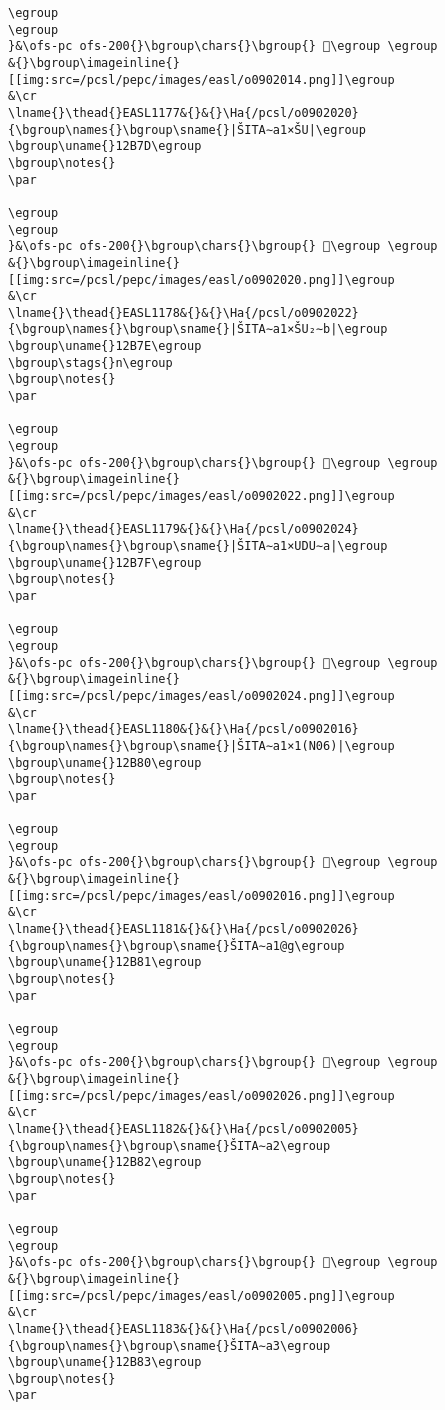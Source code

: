 \begin{verbatim}
\egroup
\egroup
}&\ofs-pc ofs-200{}\bgroup\chars{}\bgroup{} 𒭼\egroup \egroup
&{}\bgroup\imageinline{}[[img:src=/pcsl/pepc/images/easl/o0902014.png]]\egroup
&\cr
\lname{}\thead{}EASL1177&{}&{}\Ha{/pcsl/o0902020}{\bgroup\names{}\bgroup\sname{}|ŠITA∼a1×ŠU|\egroup
\bgroup\uname{}12B7D\egroup
\bgroup\notes{}
\par 

\egroup
\egroup
}&\ofs-pc ofs-200{}\bgroup\chars{}\bgroup{} 𒭽\egroup \egroup
&{}\bgroup\imageinline{}[[img:src=/pcsl/pepc/images/easl/o0902020.png]]\egroup
&\cr
\lname{}\thead{}EASL1178&{}&{}\Ha{/pcsl/o0902022}{\bgroup\names{}\bgroup\sname{}|ŠITA∼a1×ŠU₂∼b|\egroup
\bgroup\uname{}12B7E\egroup
\bgroup\stags{}n\egroup
\bgroup\notes{}
\par 

\egroup
\egroup
}&\ofs-pc ofs-200{}\bgroup\chars{}\bgroup{} 𒭾\egroup \egroup
&{}\bgroup\imageinline{}[[img:src=/pcsl/pepc/images/easl/o0902022.png]]\egroup
&\cr
\lname{}\thead{}EASL1179&{}&{}\Ha{/pcsl/o0902024}{\bgroup\names{}\bgroup\sname{}|ŠITA∼a1×UDU∼a|\egroup
\bgroup\uname{}12B7F\egroup
\bgroup\notes{}
\par 

\egroup
\egroup
}&\ofs-pc ofs-200{}\bgroup\chars{}\bgroup{} 𒭿\egroup \egroup
&{}\bgroup\imageinline{}[[img:src=/pcsl/pepc/images/easl/o0902024.png]]\egroup
&\cr
\lname{}\thead{}EASL1180&{}&{}\Ha{/pcsl/o0902016}{\bgroup\names{}\bgroup\sname{}|ŠITA∼a1×1(N06)|\egroup
\bgroup\uname{}12B80\egroup
\bgroup\notes{}
\par 

\egroup
\egroup
}&\ofs-pc ofs-200{}\bgroup\chars{}\bgroup{} 𒮀\egroup \egroup
&{}\bgroup\imageinline{}[[img:src=/pcsl/pepc/images/easl/o0902016.png]]\egroup
&\cr
\lname{}\thead{}EASL1181&{}&{}\Ha{/pcsl/o0902026}{\bgroup\names{}\bgroup\sname{}ŠITA∼a1@g\egroup
\bgroup\uname{}12B81\egroup
\bgroup\notes{}
\par 

\egroup
\egroup
}&\ofs-pc ofs-200{}\bgroup\chars{}\bgroup{} 𒮁\egroup \egroup
&{}\bgroup\imageinline{}[[img:src=/pcsl/pepc/images/easl/o0902026.png]]\egroup
&\cr
\lname{}\thead{}EASL1182&{}&{}\Ha{/pcsl/o0902005}{\bgroup\names{}\bgroup\sname{}ŠITA∼a2\egroup
\bgroup\uname{}12B82\egroup
\bgroup\notes{}
\par 

\egroup
\egroup
}&\ofs-pc ofs-200{}\bgroup\chars{}\bgroup{} 𒮂\egroup \egroup
&{}\bgroup\imageinline{}[[img:src=/pcsl/pepc/images/easl/o0902005.png]]\egroup
&\cr
\lname{}\thead{}EASL1183&{}&{}\Ha{/pcsl/o0902006}{\bgroup\names{}\bgroup\sname{}ŠITA∼a3\egroup
\bgroup\uname{}12B83\egroup
\bgroup\notes{}
\par 


\end{verbatim}

